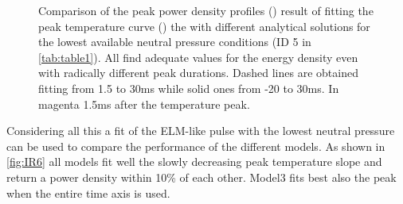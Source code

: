 \begin{figure}[!ht]
\begin{subfigure}{0.7\linewidth}
         \caption{\phantom{wew}}
         \label{fig:IR6b}
     \end{subfigure}
        \caption{Comparison of the peak power density profiles () result of fitting the peak temperature curve () the with different analytical solutions for the lowest available neutral pressure conditions (ID 5 in \autoref{tab:table1}). All find adequate values for the energy density even with radically different peak durations. Dashed lines are obtained fitting from 1.5 to 30ms while solid ones from -20 to 30ms. In magenta 1.5ms after the temperature peak.}
        \label{fig:IR6}
\end{figure}

Considering all this a fit of the ELM-like pulse with the lowest neutral pressure can be used to compare the performance of the different models. As shown in \autoref{fig:IR6} all models fit well the slowly decreasing peak temperature slope and return a power density within 10\% of each other. Model3 fits best also the peak when the entire time axis is used.

